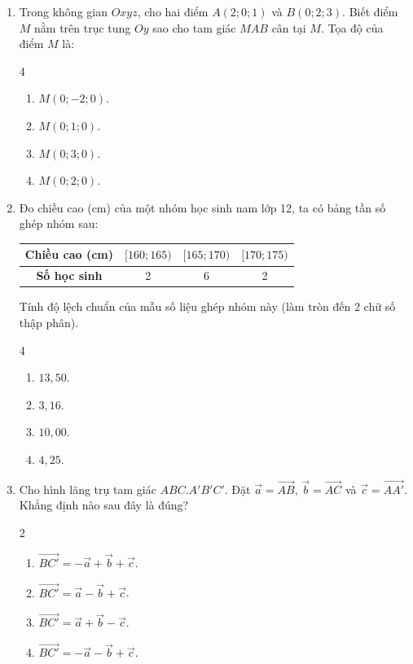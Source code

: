 \documentclass[12pt]{article}
\begin{document}
\begin{enumerate}[label=\textbf{Câu \arabic*.}, leftmargin=*]
		\item Trong không gian $Oxyz$, cho hai điểm $A(2; 0; 1)$ và $B(0; 2; 3)$. Biết điểm $M$ nằm trên trục tung $Oy$ sao cho tam giác $MAB$ cân tại $M$. Tọa độ của điểm $M$ là:
		\begin{multicols}{4}
			\begin{enumerate}[label=\Alph*.]
				\item $M(0; -2; 0)$.
				\item $M(0; 1; 0)$.
				\item $M(0; 3; 0)$.
				\item $M(0; 2; 0)$.
			\end{enumerate}
		\end{multicols}
		
		\item Đo chiều cao (cm) của một nhóm học sinh nam lớp 12, ta có bảng tần số ghép nhóm sau:
		\begin{center}
			\begin{tabular}{|c|c|c|c|}
				\hline
				\textbf{Chiều cao (cm)} & $[160; 165)$ & $[165; 170)$ & $[170; 175)$ \\
				\hline
				\textbf{Số học sinh} & 2 & 6 & 2 \\
				\hline
			\end{tabular}
		\end{center}
		Tính độ lệch chuẩn của mẫu số liệu ghép nhóm này (làm tròn đến 2 chữ số thập phân).
		\begin{multicols}{4}
			\begin{enumerate}[label=\Alph*.]
				\item $13,50$.
				\item $3,16$.
				\item $10,00$.
				\item $4,25$.
			\end{enumerate}
		\end{multicols}
		
		\item Cho hình lăng trụ tam giác $ABC.A'B'C'$. Đặt $\vec{a} = \overrightarrow{AB}$, $\vec{b} = \overrightarrow{AC}$ và $\vec{c} = \overrightarrow{AA'}$. Khẳng định nào sau đây là đúng?
		\begin{multicols}{2}
			\begin{enumerate}[label=\Alph*.]
				\item $\overrightarrow{BC'} = -\vec{a} + \vec{b} + \vec{c}$.
				\item $\overrightarrow{BC'} = \vec{a} - \vec{b} + \vec{c}$.
				\item $\overrightarrow{BC'} = \vec{a} + \vec{b} - \vec{c}$.
				\item $\overrightarrow{BC'} = -\vec{a} - \vec{b} + \vec{c}$.
			\end{enumerate}
		\end{multicols}
		

\end{enumerate}
\end{document}
